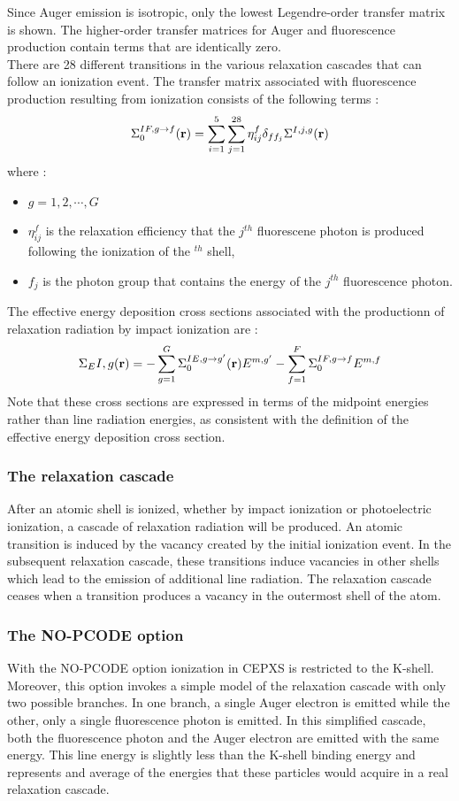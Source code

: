Since Auger emission is isotropic, only the lowest Legendre-order transfer
matrix is shown. The higher-order transfer matrices for Auger and fluorescence
production contain terms that are identically zero.\\
There are 28 different transitions in the various relaxation cascades that can
follow an ionization event. The transfer matrix associated with fluorescence
production resulting from ionization consists of the following terms :
\begin{equation}
\Sigma_{0}^{IF,g\rightarrow f}(\mathbf{r}) = \sum_{i=1}^5 \sum_{j=1}^{28} \eta_{ij}^f
\delta_{ff_j} \Sigma^{I,j,g}(\mathbf{r})
\end{equation}
where :
\begin{itemize}
\item $g=1,2,\cdots,G$
\item $\eta_{ij}^f$ is the relaxation efficiency that the $j^{th}$ fluorescene
photon is produced following the ionization of the $^{th}$ shell,
\item $f_j$ is the photon group that contains the energy of the $j^{th}$
fluorescence photon.
\end{itemize}
The effective energy deposition cross sections associated with the productionn
of relaxation radiation by impact ionization are :
\begin{equation}
\Sigma_E{I,g}(\mathbf{r}) = - \sum_{g=1}^G \Sigma_0^{IE,g\rightarrow g'}(\mathbf{r})E^{m,g'}
- \sum_{f=1}^F \Sigma_0^{IF,g\rightarrow f} E^{m,f}
\end{equation}
Note that these cross sections are expressed in terms of the midpoint energies
rather than line radiation energies, as consistent with the definition of the
effective energy deposition cross section.

\subsubsection{The relaxation cascade}
After an atomic shell is ionized, whether by impact ionization or
photoelectric ionization, a cascade of relaxation radiation will be produced.
An atomic transition is induced by the vacancy created by the initial
ionization event. In the subsequent relaxation cascade, these transitions
induce vacancies in other shells which lead to the emission of additional line
radiation. The relaxation cascade ceases when a transition produces a vacancy
in the outermost shell of the atom.

\subsubsection{The NO-PCODE option}
With the NO-PCODE option ionization in CEPXS is restricted to the K-shell.
Moreover, this option invokes a simple model of the relaxation cascade with
only two possible branches. In one branch, a single Auger electron is emitted
while the other, only a single fluorescence photon is emitted. In this
simplified cascade, both the fluorescence photon and the Auger electron are
emitted with the same energy. This line energy is slightly less than the
K-shell binding energy and represents and average of the energies that these
particles would acquire in a real relaxation cascade.


